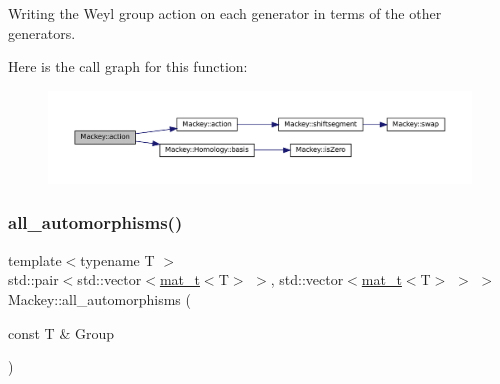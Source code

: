Writing the Weyl group action on each generator in terms of the other generators. 

Here is the call graph for this function\+:\nopagebreak
\begin{figure}[H]
\begin{center}
\leavevmode
\includegraphics[width=350pt]{namespaceMackey_aaa66c9857ba86a13949d1b1825ea20f7_cgraph}
\end{center}
\end{figure}
\mbox{\label{namespaceMackey_a2556e2a1f78783585df78de1c1b35eae}} 
\subsubsection{\texorpdfstring{all\+\_\+automorphisms()}{all\_automorphisms()}}
{\footnotesize\ttfamily template$<$typename T $>$ \\
std\+::pair$<$std\+::vector$<$\hyperlink{namespaceMackey_a035386035757dade630f685e508e5cf9}{mat\+\_\+t}$<$T$>$ $>$, std\+::vector$<$\hyperlink{namespaceMackey_a035386035757dade630f685e508e5cf9}{mat\+\_\+t}$<$T$>$ $>$ $>$ Mackey\+::all\+\_\+automorphisms (\begin{DoxyParamCaption}\item[{const T \&}]{Group }\end{DoxyParamCaption})}

